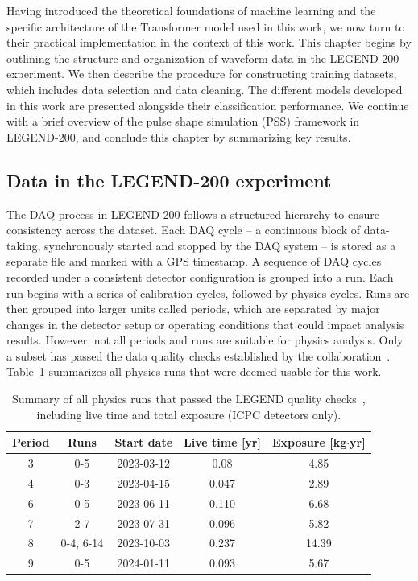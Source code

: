 Having introduced the theoretical foundations of machine learning and the specific architecture of the Transformer model used in this work, we now turn to their practical implementation in the context of this work. 
This chapter begins by outlining the structure and organization of waveform data in the LEGEND-200 experiment. We then describe the procedure for constructing training datasets, which includes data selection and data cleaning. 
The different models developed in this work are presented alongside their classification performance. We continue with a brief overview of the pulse shape simulation (PSS) framework in LEGEND-200, and conclude this chapter by summarizing key results. 


\subsection{Data in the LEGEND-200 experiment} \label{sec:04_LEGEND_data}

The DAQ process in LEGEND-200 follows a structured hierarchy to ensure consistency across the dataset. Each DAQ cycle -- a continuous block of data-taking, synchronously started and stopped by the DAQ system -- is stored as a separate file and marked with a GPS timestamp.  
A sequence of DAQ cycles recorded under a consistent detector configuration is grouped into a run. Each run begins with a series of calibration cycles, followed by physics cycles. 
Runs are then grouped into larger units called periods, which are separated by major changes in the detector setup or operating conditions that could impact analysis results. 
However, not all periods and runs are suitable for physics analysis. Only a subset has passed the data quality checks established by the collaboration~\cite{lnote_24010}. Table~\ref{tab:periods_runs} summarizes all physics runs that were deemed usable for this work.

\begin{table}[b]
\centering
\caption{Summary of all physics runs that passed the LEGEND quality checks~\cite{lnote_24010}, including live time and total exposure (ICPC detectors only). } 
\begin{tabular}{||c | c | c| c | c||} 
    \hline
    \textbf{Period} & \textbf{Runs} & \textbf{Start date} & \textbf{Live time [yr]}  & \textbf{Exposure [kg$\cdot$yr]} \\ 
    \hline
    3 & 0-5 & 2023-03-12 & 0.08 & 4.85 \\
    \hline
    4 & 0-3 & 2023-04-15 & 0.047 & 2.89 \\
    \hline
    6 & 0-5 & 2023-06-11 & 0.110 & 6.68 \\
    \hline
    7 & 2-7 & 2023-07-31 & 0.096 & 5.82 \\
    \hline
    8 & 0-4, 6-14 & 2023-10-03 & 0.237 & 14.39 \\
    \hline
    9 & 0-5 & 2024-01-11 & 0.093 & 5.67 \\
    \hline
\end{tabular}
\label{tab:periods_runs}
\end{table}

